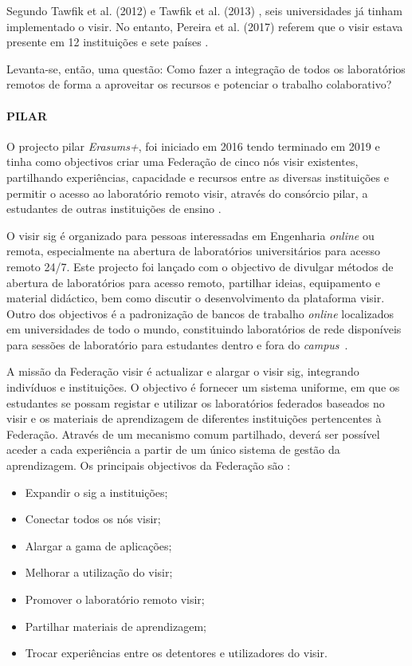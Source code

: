 Segundo Tawfik et al. (2012) \cite{tawfikexperiences} e Tawfik et al. (2013) \cite{tawfikvisir}, seis universidades já tinham implementado o \acrshort{visir}. No entanto, Pereira et al. (2017) referem que o \acrshort{visir} estava presente em 12 instituições e sete países \cite{pereira}.

Levanta-se, então, uma questão: Como fazer a integração de todos os laboratórios remotos de forma a aproveitar os recursos e potenciar o trabalho colaborativo?

\paragraph{PILAR}
O projecto \acrfull{pilar} \textit{Erasums+}, foi iniciado em 2016 tendo terminado em 2019 e tinha como objectivos criar uma Federação de cinco nós \acrshort{visir} existentes, partilhando experiências, capacidade e recursos entre as diversas instituições e permitir o acesso ao laboratório remoto \acrshort{visir}, através do consórcio \acrshort{pilar}, a estudantes de outras instituições de ensino \cite{garcia-loro}.

O \acrshort{visir} \acrfull{sig} é organizado para pessoas interessadas em Engenharia \textit{online} ou remota, especialmente na abertura de laboratórios universitários para acesso remoto 24/7. Este projecto foi lançado com o objectivo de divulgar métodos de abertura de laboratórios para acesso remoto,  partilhar ideias, equipamento e material didáctico, bem como discutir o desenvolvimento da plataforma \acrshort{visir}. Outro dos objectivos é a padronização de bancos de trabalho \textit{online} localizados em universidades de todo o mundo, constituindo laboratórios de rede disponíveis para sessões de laboratório para estudantes dentro e fora do \textit{campus}~\cite{visirsig}.

A missão da Federação \acrshort{visir} é actualizar e alargar o \acrshort{visir} \acrshort{sig}, integrando indivíduos e instituições. O objectivo é fornecer um sistema uniforme, em que os estudantes se possam registar e utilizar os laboratórios federados baseados no \acrshort{visir} e os materiais de aprendizagem de diferentes instituições pertencentes à Federação. Através de um mecanismo comum partilhado, deverá ser possível aceder a cada experiência a partir de um único sistema de gestão da aprendizagem. Os principais objectivos da Federação são \cite{visirfederation}:
\begin{itemize}
    \item Expandir o \acrshort{sig} a instituições;
    \item Conectar todos os nós \acrshort{visir};
    \item Alargar a gama de aplicações;
    \item Melhorar a utilização do \acrshort{visir};
    \item Promover o laboratório remoto \acrshort{visir};
    \item Partilhar materiais de aprendizagem;
    \item Trocar experiências entre os detentores e utilizadores do \acrshort{visir}.
\end{itemize}

